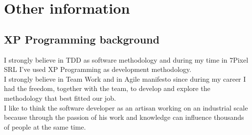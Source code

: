 \documentclass[letterpaper]{twentysecondcv} %
\begin{document}

\section{Other information}

\subsection{XP Programming background}

I strongly believe in TDD as software methodology and during my time in 7Pixel SRL I've used XP Programming as development methodology.\\
I strongly believe in Team Work and in Agile manifesto since during my career I had the freedom, together with the team,
to develop and explore the methodology that best fitted our job.\\
I like to think the software developer as an artisan working on an industrial scale because through the passion of his work
and knowledge can influence thousands of people at the same time.





\end{document}
